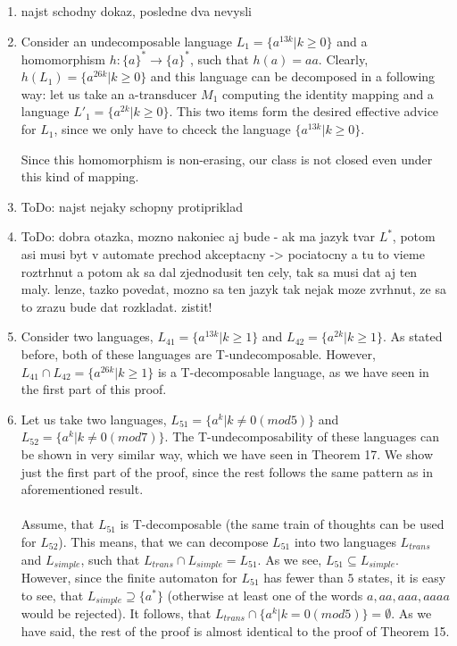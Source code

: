 \begin{enumerate}
\item \color{red}najst schodny dokaz, posledne dva nevysli\color{black}

\item Consider an undecomposable language $L_1 = \{ a^{13k} | k \geq 0 \}$ and a homomorphism $h:\{ a\}^* \to \{ a \}^*$, such that $h(a) = aa$. Clearly, $h(L_1) = \{ a^{26k} | k \geq 0 \}$ and this language can be decomposed in a following way: let us take an a-transducer $M_1$ computing the identity mapping and a language $L'_1 = \{ a^{2k} | k \geq 0 \}$. This two items form the desired effective advice for $L_1$, since we only have to chceck the language $\{ a^{13k} | k \geq 0 \}$.

Since this homomorphism is non-erasing, our class is not closed even under this kind of mapping.

\item \color{red}ToDo: najst nejaky schopny protipriklad\color{black}

\item \color{red}ToDo: dobra otazka, mozno nakoniec aj bude - ak ma jazyk  tvar $L^*$, potom asi musi byt v automate prechod akceptacny -> pociatocny a tu to vieme roztrhnut a potom ak sa dal zjednodusit ten cely, tak sa musi dat aj ten maly. lenze, tazko povedat, mozno sa ten jazyk tak nejak moze zvrhnut, ze sa to zrazu bude dat rozkladat. zistit!\color{black}

\item Consider two languages, $L_{41} = \{ a^{13k} | k \geq 1 \}$ and $L_{42} = \{ a^{2k} | k \geq 1 \}$. As stated before, both of these languages are T-undecomposable. However, $L_{41} \cap L_{42} = \{ a^{26k} | k \geq 1 \}$ is a T-decomposable language, as we have seen in the first part of this proof.

\item Let us take two languages, $L_{51} = \{ a^k | k \neq 0 (mod 5) \}$ and $L_{52} = \{ a^k | k \neq 0 (mod 7) \}$. The T-undecomposability of these languages can be shown in very similar way, which we have seen in Theorem 17. We show just the first part of the proof, since the rest follows the same pattern as in aforementioned result.

\paragraph{}
Assume, that $L_{51}$ is T-decomposable (the same train of thoughts can be used for $L_{52}$). This means, that we can decompose $L_{51}$ into two languages $L_{trans}$ and $L_{simple}$, such that $L_{trans} \cap L_{simple} = L_{51}$. As we see, $L_{51} \subseteq L_{simple}$. However, since the finite automaton for $L_{51}$ has fewer than $5$ states, it is easy to see, that $L_{simple} \supseteq \{a^*\}$ (otherwise at least one of the words $a, aa, aaa, aaaa$ would be rejected). It  follows, that $L_{trans} \cap \{ a^k | k = 0 (mod 5) \} = \emptyset$. As we  have said, the rest of the proof is almost identical to the proof of Theorem 15.


\end{enumerate}
